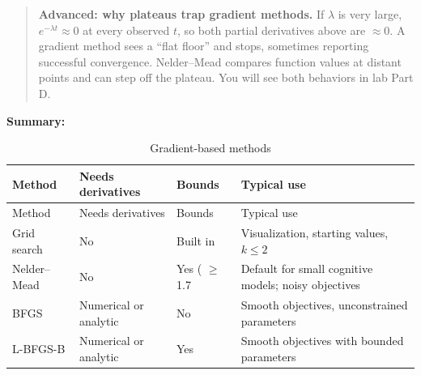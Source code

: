 \begin{quote}
\textbf{Advanced: why plateaus trap gradient methods.} If \(\lambda\) is
very large, \(e^{-\lambda t} \approx 0\) at every observed \(t\), so
both partial derivatives above are \(\approx 0\). A gradient method sees
a ``flat floor'' and stops, sometimes reporting successful convergence.
Nelder--Mead compares function values at distant points and can step off
the plateau. You will see both behaviors in lab Part D.
\end{quote}

\textbf{Summary:}

\begin{longtable}[]{@{}
  >{\raggedright\arraybackslash}p{}
  >{\raggedright\arraybackslash}p{}
  >{\raggedright\arraybackslash}p{}
  >{\raggedright\arraybackslash}p{}@{}}
\caption{ Gradient-based methods}\tabularnewline
\toprule\noalign{}
\begin{minipage}[b]{\linewidth}\raggedright
Method
\end{minipage} & \begin{minipage}[b]{\linewidth}\raggedright
Needs derivatives
\end{minipage} & \begin{minipage}[b]{\linewidth}\raggedright
Bounds
\end{minipage} & \begin{minipage}[b]{\linewidth}\raggedright
Typical use
\end{minipage} \\
\midrule\noalign{}
\endfirsthead
\toprule\noalign{}
\begin{minipage}[b]{\linewidth}\raggedright
Method
\end{minipage} & \begin{minipage}[b]{\linewidth}\raggedright
Needs derivatives
\end{minipage} & \begin{minipage}[b]{\linewidth}\raggedright
Bounds
\end{minipage} & \begin{minipage}[b]{\linewidth}\raggedright
Typical use
\end{minipage} \\
\midrule\noalign{}
\endhead
\bottomrule\noalign{}
\endlastfoot
Grid search & No & Built in & Visualization, starting values,
\(k \le 2\) \\
Nelder--Mead & No & Yes ( \ensuremath{\geq} 1.7 & Default for small cognitive models;
noisy objectives \\
BFGS & Numerical or analytic & No & Smooth objectives, unconstrained
parameters \\
L-BFGS-B & Numerical or analytic & Yes & Smooth objectives with bounded
parameters \\
\end{longtable}


